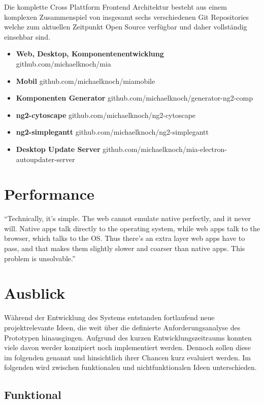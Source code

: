 Die komplette Cross Plattform Frontend Architektur besteht aus einem komplexen Zusammenspiel von insgesamt sechs verschiedenen Git Repositories
welche zum aktuellen Zeitpunkt Open Source verfügbar und daher vollständig einsehbar sind.

\begin{itemize}
  \item{\textbf{Web, Desktop, Komponentenentwicklung} github.com/michaelknoch/mia}
  \item{\textbf{Mobil} github.com/michaelknoch/miamobile}
  \item{\textbf{Komponenten Generator} github.com/michaelknoch/generator-ng2-comp}
  \item{\textbf{ng2-cytoscape} github.com/michaelknoch/ng2-cytoscape}
  \item{\textbf{ng2-simplegantt} github.com/michaelknoch/ng2-simplegantt}
  \item{\textbf{Desktop Update Server} github.com/michaelknoch/mia-electron-autoupdater-server}
\end{itemize}


\section{Performance}

``Technically, it’s simple. The web cannot emulate native perfectly, and it never will.
Native apps talk directly to the operating system, while web apps talk to the browser,
which talks to the OS. Thus there’s an extra layer web apps have to pass, and that makes them slightly slower and
coarser than native apps.
This problem is unsolvable.'' \cite{Webvs43:online}

\vspace{0.3cm}


\section{Ausblick}

Während der Entwicklung des Systems entstanden fortlaufend neue projektrelevante Ideen,
die weit über die definierte Anforderungsanalyse des Prototypen hinausgingen.
Aufgrund des kurzen Entwicklungszeitraums konnten viele davon werder konzipiert noch implementiert werden.
Dennoch sollen diese im folgenden genannt und hinsichtlich ihrer Chancen kurz evaluiert werden.
Im folgenden wird zwischen funktionalen und nichtfunktionalen Ideen unterschieden.

\subsection{Funktional}

